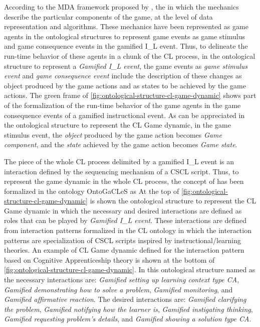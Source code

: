 According to the MDA framework proposed by , the  in which the mechanics describe the particular components of the game, at the level of data representation and algorithms. 
These mechanics have been represented as game agents in the ontological structures to represent game events as game stimulus and game consequence events in the gamified I\_L event.
Thus, to delineate the run-time behavior of these agents in a chunk of the CL process, in the ontological structure to represent a \emph{Gamified I\_L event}, the game events as \emph{game stimulus event} and \emph{game consequence event} include the description of these changes as object produced by the game actions and as states to be achieved by the game actions.
The green frame of \autoref{fig:ontological-structure-cl-game-dynamic} shows part of the formalization of the run-time behavior of the game agents in the game consequence events of a gamified instructional event.
As can be appreciated in the ontological structure to represent the CL Game dynamic, in the game stimulus event, the \emph{object} produced by the game action becomes \emph{Game component}, and the \emph{state} achieved by the game action becomes \emph{Game state}.

The piece of the whole CL process delimited by a gamified I\_L event is an interaction defined by the sequencing mechanism of a CSCL script.
Thus, to represent the game dynamic in the whole CL process, the concept of  has been formalized in the ontology OntoGaCLeS as 
At the top of \autoref{fig:ontological-structure-cl-game-dynamic} is shown the ontological structure to represent the CL Game dynamic in which the necessary and desired interactions are defined as roles that can be played by \emph{Gamified I\_L event}.
These interactions are defined from interaction patterns formalized in the CL ontology in which the interaction patterns are specialization of CSCL scripts inspired by instructional/learning theories.
An example of CL Game dynamic defined for the interaction pattern based on Cognitive Apprenticeship theory is shown at the bottom of \autoref{fig:ontological-structure-cl-game-dynamic}.
In this ontological structure named as  the necessary interactions are: \emph{Gamified setting up learning context type CA}, \emph{Gamified demonstrating how to solve a problem}, \emph{Gamified monitoring}, and \emph{Gamified affirmative reaction}.
The desired interactions are: \emph{Gamified clarifying the problem}, \emph{Gamified notifying how the learner is}, \emph{Gamified instigating thinking}, \emph{Gamified requesting problem's details}, and \emph{Gamified showing a solution type CA}.

